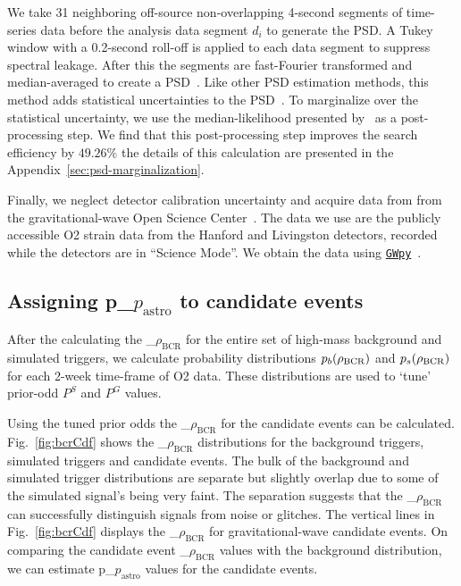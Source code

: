 \documentclass[%
 nofootinbib,
 amsmath,amssymb,
 aps,
 twocolumn,
 superscriptaddress
]{revtex4-2}
\newcommand{\gwpy}{{\sc \href{https://gwpy.github.io/}{\texttt{GWpy}}}\xspace}
\newcommand{\fancytext}[1]{{\relax\ifmmode#1\else $#1$\fi}\xspace}
\newcommand{\mathcmd}[1]{{\sc \relax\ifmmode#1\else $#1$\fi}\xspace}
\newcommand{\bcr}{\mathcmd{\rho_\text{BCR}}}
\newcommand{\pastro}{\fancytext{p_\text{astro}}}
\begin{document}
We take 31 neighboring off-source non-overlapping  4-second  segments of time-series data before the analysis data segment $d_i$ to generate the PSD.  A Tukey window with a 0.2-second roll-off is applied to each data segment to suppress spectral leakage. After this  the segments are fast-Fourier transformed and median-averaged to create a PSD~\cite{ligo_psd}. Like other PSD estimation methods, this method adds statistical uncertainties to the PSD~\cite{psd_student_t, chatziioannou2019noise, Biscoveanu:2020:PhRvD}. To marginalize over the statistical uncertainty, we use the median-likelihood presented by~\citet{psd_student_t} as a post-processing step. We find that this post-processing step improves the search efficiency by $49.26\%$ the details of this calculation are presented in the Appendix~\ref{sec:psd-marginalization}.

Finally, we neglect detector calibration uncertainty and acquire data from from the gravitational-wave Open Science Center~\cite{GWOSC}. The data we use are the publicly accessible O2 strain data from the Hanford and Livingston detectors, recorded while the detectors are in ``Science Mode''. We obtain the data using \gwpy~\cite{gwpy}. 

\subsection{Assigning \pastro to candidate events}
After the calculating the \bcr for the entire set of high-mass background and simulated triggers, we calculate probability distributions $p_b(\bcr)$ and $p_s(\bcr)$ for each 2-week time-frame of O2 data. These distributions are used to `tune' prior-odd $P^S$ and $P^G$ values.

Using the tuned prior odds the \bcr for the candidate events can be calculated. Fig.~\ref{fig:bcrCdf} shows the \bcr distributions for the background triggers, simulated triggers and candidate events. The bulk of the background and simulated trigger distributions are separate but slightly overlap due to some of the simulated signal's being very faint. The separation suggests that the \bcr can successfully distinguish signals from noise or glitches. The vertical lines in Fig.~\ref{fig:bcrCdf} displays the \bcr for gravitational-wave candidate events. On comparing the candidate event \bcr values with the background distribution, we can estimate \pastro values for the candidate events. 
\end{document}
